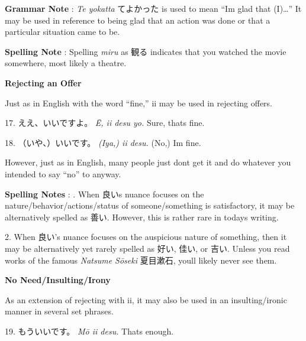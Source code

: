 \par{\textbf{Grammar Note }: \emph{Te yokatta }てよかった is used to mean “I\textquotesingle m glad that (I)…” It may be used in reference to being glad that an action was done or that a particular situation came to be. }

\par{\textbf{Spelling Note }: Spelling \emph{miru }as 観る indicates that you watched the movie somewhere, most likely a theatre. }

\par{\textbf{Rejecting an Offer }}

\par{ Just as in English with the word “fine,” ii may be used in rejecting offers. }

\par{17. ええ、いいですよ。 \hfill\break
 \emph{Ē, ii desu yo. }\hfill\break
Sure, that\textquotesingle s fine. }

\par{18. （いや、）いいです。 \hfill\break
 \emph{(Iya,) ii desu. }\hfill\break
(No,) I\textquotesingle m fine. }

\par{ However, just as in English, many people just don\textquotesingle t get it and do whatever you intended to say “no” to anyway. }

\par{\textbf{Spelling Notes }: \hfill\break
 \hfill{}. When 良い\textquotesingle s nuance focuses on the nature\slash behavior\slash actions\slash status of someone\slash something is satisfactory, it may be alternatively spelled as 善い. However, this is rather rare in today\textquotesingle s writing. }

\par{2. When 良い's nuance focuses on the auspicious nature of something, then it may be alternatively yet rarely spelled as 好い, 佳い, or 吉い. Unless you read works of the famous \emph{Natsume Sōseki }夏目漱石, you\textquotesingle ll likely never see them. }

\begin{center}
\textbf{No Need\slash Insulting\slash Irony }
\end{center}

\par{ As an extension of rejecting with ii, it may also be used in an insulting\slash ironic manner in several set phrases. }

\par{19. もういいです。 \hfill\break
 \emph{Mō ii desu. }\hfill\break
That\textquotesingle s enough. }

